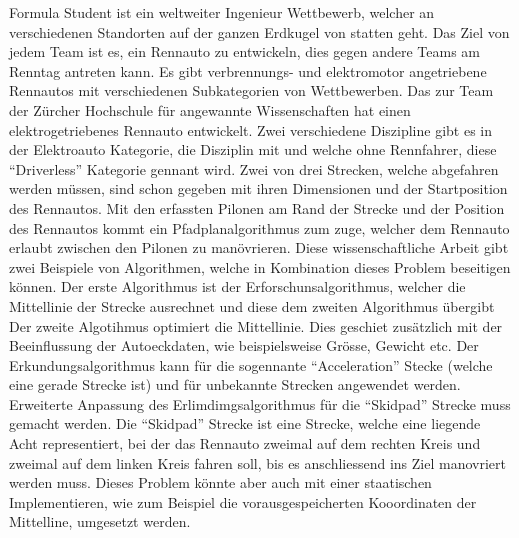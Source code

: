 Formula Student ist ein weltweiter Ingenieur Wettbewerb, welcher an verschiedenen Standorten auf der ganzen Erdkugel von statten geht. Das Ziel von jedem Team ist es, ein Rennauto zu entwickeln, dies gegen andere Teams am Renntag antreten kann. Es gibt verbrennungs- und elektromotor angetriebene Rennautos mit verschiedenen Subkategorien von Wettbewerben. Das \acrlong{zur} Team der Zürcher Hochschule für angewannte Wissenschaften hat einen elektrogetriebenes Rennauto entwickelt. Zwei verschiedene Diszipline gibt es in der Elektroauto Kategorie, die Disziplin mit und welche ohne Rennfahrer, diese ``Driverless'' Kategorie gennant wird. Zwei von drei Strecken, welche abgefahren werden müssen, sind schon gegeben mit ihren Dimensionen und der Startposition des Rennautos. Mit den erfassten Pilonen am Rand der Strecke und der Position des Rennautos kommt ein Pfadplanalgorithmus zum zuge, welcher dem Rennauto erlaubt zwischen den Pilonen zu manövrieren. Diese wissenschaftliche Arbeit gibt zwei Beispiele von Algorithmen, welche in Kombination dieses Problem beseitigen können. Der erste Algorithmus ist der Erforschunsalgorithmus, welcher die Mittellinie der Strecke ausrechnet und diese dem zweiten Algorithmus übergibt Der zweite Algotihmus optimiert die Mittellinie. Dies geschiet zusätzlich mit der Beeinflussung der Autoeckdaten, wie beispielsweise Grösse, Gewicht etc. Der Erkundungsalgorithmus kann für die sogennante ``Acceleration'' Stecke (welche eine gerade Strecke ist) und für unbekannte Strecken angewendet werden. Erweiterte Anpassung des Erlimdimgsalgorithmus für die ``Skidpad'' Strecke muss gemacht werden. Die ``Skidpad'' Strecke ist eine Strecke, welche eine liegende Acht representiert, bei der das Rennauto zweimal auf dem rechten Kreis und zweimal auf dem linken Kreis fahren soll, bis es anschliessend ins Ziel manovriert werden muss. Dieses Problem könnte aber auch mit einer staatischen Implementieren, wie zum Beispiel die vorausgespeicherten Kooordinaten der Mittelline, umgesetzt werden.